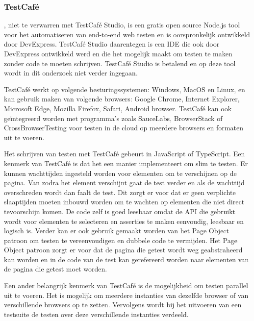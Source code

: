 \subsubsection{TestCafé}
\textcite{Testcafe}, niet te verwarren met TestCafé Studio, is een  gratis open source Node.js \gls{tool} voor het automatiseren van end-to-end web testen en is oorspronkelijk ontwikkeld door DevExpress. TestCafé Studio daarentegen is een \gls{IDE} die ook door DevExpress ontwikkeld werd en die het mogelijk maakt om testen te maken zonder code te moeten schrijven. TestCafé Studio is betalend en op deze \gls{tool} wordt in dit onderzoek niet verder ingegaan.

TestCafé werkt op volgende besturingssystemen: Windows, MacOS en Linux, en kan gebruik maken van volgende browsers: Google Chrome, Internet Explorer, Microsoft Edge, Mozilla Firefox, Safari, Android browser. TestCafé kan ook geïntegreerd worden met programma's zoals SauceLabs, BrowserStack of CrossBrowserTesting voor testen in de cloud op meerdere browsers en formaten uit te voeren.

Het schrijven van testen met TestCafé gebeurt in JavaScript of \gls{TypeScript}.  Een kenmerk van TestCafé is dat het een manier implementeert om slim te testen. Er kunnen wachttijden ingesteld worden voor elementen om te verschijnen op de pagina. Van zodra het element verschijnt gaat de test verder en als de wachttijd overschreden wordt dan faalt de test. Dit zorgt er voor dat er geen verplichte slaaptijden moeten inbouwd worden om te wachten op elementen die niet direct tevoorschijn komen. De code zelf is goed leesbaar omdat de \gls{API} die gebruikt wordt voor elementen te selecteren en \glspl{assertie} te maken eenvoudig, leesbaar en logisch is. Verder kan er ook gebruik gemaakt worden van het Page Object patroon om testen te vereenvoudigen en dubbele code te vermijden. Het Page Object patroon zorgt er voor dat de pagina die getest wordt weg geabstraheerd kan worden en in de code van de test kan gerefereerd worden naar elementen van de pagina die getest moet worden. 

Een ander belangrijk kenmerk van TestCafé is de mogelijkheid om testen parallel uit te voeren. Het is mogelijk om meerdere instanties van dezelfde browser of van verschillende browsers op te zetten. Vervolgens wordt bij het uitvoeren van een \gls{testsuite} de testen over deze verschillende instanties verdeeld.

